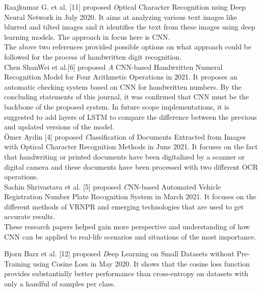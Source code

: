 \noindent
Raajkumar G. et al. [11] proposed {\textit Optical Character Recognition using Deep Neural Network} in July 2020. 
\noindent
It aims at analyzing various text images like blurred and tilted images and it identifies the text from these images using deep learning models. The approach in focus here is CNN.\\

\noindent
The above two references provided possible options on what approach could be followed for the process of handwritten digit recognition.\\

\noindent
Chen ShanWei et al.[6] proposed {\textit A CNN-based Handwritten Numeral Recognition Model for Four Arithmetic Operations} in 2021. It proposes an automatic checking system based on CNN for handwritten numbers. By the concluding statements of this journal, it was confirmed that CNN must be the backbone of the proposed system. In future scope implementations, it is suggested to add layers of LSTM to compare the difference between the previous and updated versions of the model. \\

\noindent
Ömer Aydin [4] proposed {\textit Classification of Documents Extracted from Images with Optical Character Recognition Methods} in June 2021. 
\noindent
It focuses on the fact that handwriting or printed documents have been digitalized by a scanner or digital camera and these documents have been processed with two different OCR operations. \\

\noindent
Sachin Shrivastava et al. [5] proposed {\textit CNN-based Automated Vehicle Registration Number Plate Recognition System} in March 2021.
\noindent
It focuses on the different methods of VRNPR and emerging technologies that are used to get accurate results. \\

\noindent
These research papers helped gain more perspective and understanding of how CNN can be applied to real-life scenarios and situations of the most importance.

\clearpage

\noindent
Bjorn Barz et al. [12] proposed {\textit Deep Learning on Small Datasets without Pre-Training using Cosine Loss} in May 2020. 
\noindent
It shows that the cosine loss function provides substantially better performance than cross-entropy on datasets with only a handful of samples per class. \\

